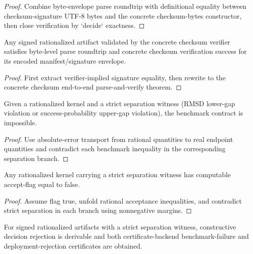 \begin{proof}
Combine byte-envelope parse roundtrip with definitional equality between checksum-signature UTF-8 bytes and the concrete checksum-bytes constructor, then close verification by `decide` exactness.
\end{proof}

\begin{theorem}
\label{thm:definitive-signed-rationalized-concrete-byte-parse-verify}
Any signed rationalized artifact validated by the concrete checksum verifier satisfies byte-level parse roundtrip and concrete checksum verification success for its encoded manifest/signature envelope.
\end{theorem}

\begin{proof}
First extract verifier-implied signature equality, then rewrite to the concrete checksum end-to-end parse-and-verify theorem.
\end{proof}

\begin{theorem}
\label{thm:definitive-rationalized-separation-not-benchmark-contract}
Given a rationalized kernel and a strict separation witness (RMSD lower-gap violation or success-probability upper-gap violation), the benchmark contract is impossible.
\end{theorem}

\begin{proof}
Use absolute-error transport from rational quantities to real endpoint quantities and contradict each benchmark inequality in the corresponding separation branch.
\end{proof}

\begin{theorem}
\label{thm:definitive-rationalized-separation-flag-false}
Any rationalized kernel carrying a strict separation witness has computable accept-flag equal to false.
\end{theorem}

\begin{proof}
Assume flag true, unfold rational acceptance inequalities, and contradict strict separation in each branch using nonnegative margins.
\end{proof}

\begin{theorem}
\label{thm:definitive-signed-rationalized-strict-rejection-refines-certificate-backend-rejections}
For signed rationalized artifacts with a strict separation witness, constructive decision rejection is derivable and both certificate-backend benchmark-failure and deployment-rejection certificates are obtained.
\end{theorem}

